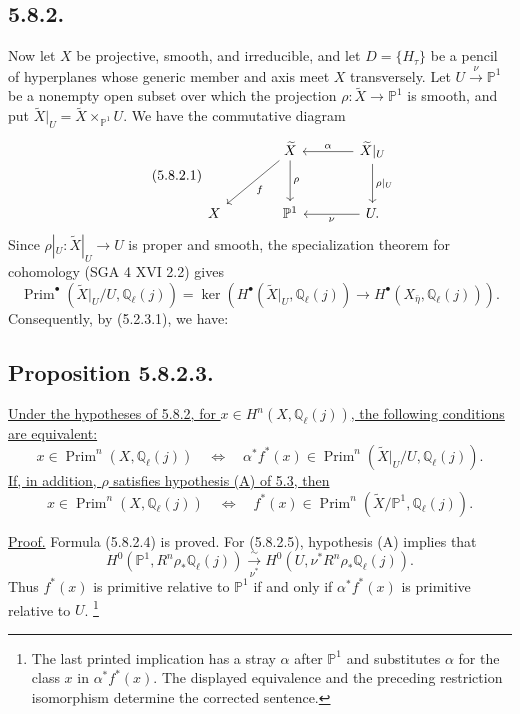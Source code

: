 \subsection*{5.8.2.}
Now let $X$ be projective, smooth, and irreducible, and let
$D=\{H_\tau\}$ be a pencil of hyperplanes whose generic member and axis
meet $X$ transversely.  Let
$U\xrightarrow{\nu}\mathbb P^1$ be a nonempty open subset over which the
projection $\rho:\widetilde X\to\mathbb P^1$ is smooth, and put
$\widetilde X|_U=\widetilde X\times_{\mathbb P^1}U$.  We have the
commutative diagram
\begin{equation}\tag{5.8.2.1}
\begin{tikzcd}[column sep=large,row sep=large]
{}
&
\widetilde X
  \arrow[dl,"f"]
  \arrow[d,"\rho"]
&
\widetilde X|_U
  \arrow[l,"\alpha"']
  \arrow[d,"\rho|_U"]
\\
X
&
\mathbb P^1
&
U\arrow[l,"\nu"].
\end{tikzcd}
\end{equation}
Since $\rho|_U:\widetilde X|_U\to U$ is proper and smooth, the
specialization theorem for cohomology (SGA 4 XVI 2.2) gives
\begin{equation}\tag{5.8.2.2}
\operatorname{Prim}^\bullet(\widetilde X|_U/U,\mathbb Q_\ell(j))
=\ker\!\left(
H^\bullet(\widetilde X|_U,\mathbb Q_\ell(j))
\longrightarrow H^\bullet(X_{\bar\eta},\mathbb Q_\ell(j))
\right).
\end{equation}
Consequently, by (5.2.3.1), we have:

\subsection*{Proposition 5.8.2.3.}
\underline{Under the hypotheses of 5.8.2, for
$x\in H^n(X,\mathbb Q_\ell(j))$, the following conditions are equivalent:}
\begin{equation}\tag{5.8.2.4}
x\in\operatorname{Prim}^n(X,\mathbb Q_\ell(j))
\quad\Longleftrightarrow\quad
\alpha^*f^*(x)\in
\operatorname{Prim}^n(\widetilde X|_U/U,\mathbb Q_\ell(j)).
\end{equation}
\underline{If, in addition, $\rho$ satisfies hypothesis (A) of 5.3, then}
\begin{equation}\tag{5.8.2.5}
x\in\operatorname{Prim}^n(X,\mathbb Q_\ell(j))
\quad\Longleftrightarrow\quad
f^*(x)\in
\operatorname{Prim}^n(\widetilde X/\mathbb P^1,\mathbb Q_\ell(j)).
\end{equation}

\underline{Proof.}
Formula (5.8.2.4) is proved.  For (5.8.2.5), hypothesis (A) implies that
\[
H^0(\mathbb P^1,R^n\rho_*\mathbb Q_\ell(j))
\xrightarrow[\nu^*]{\sim}
H^0(U,\nu^*R^n\rho_*\mathbb Q_\ell(j)).
\]
Thus $f^*(x)$ is primitive relative to $\mathbb P^1$ if and only if
$\alpha^*f^*(x)$ is primitive relative to $U$.
\footnote{The last printed implication has a stray $\alpha$ after
$\mathbb P^1$ and substitutes $\alpha$ for the class $x$ in
$\alpha^*f^*(x)$.  The displayed equivalence and the preceding restriction
isomorphism determine the corrected sentence.}

